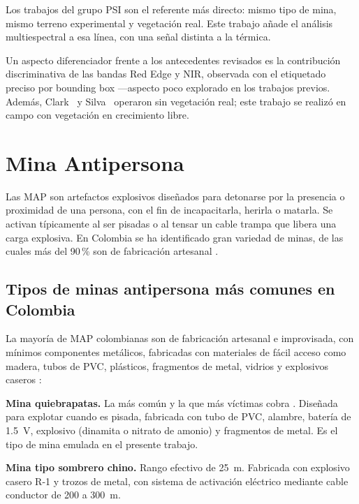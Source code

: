 \clearpage
Los trabajos del grupo \ac{PSI} \cite{forero2022,tenorio2024} son el
referente más directo: mismo tipo de mina, mismo terreno experimental y
vegetación real. Este trabajo añade el análisis multiespectral a esa línea,
con una señal distinta
a la térmica.

Un aspecto diferenciador frente a los antecedentes revisados es la contribución
discriminativa de las bandas Red Edge y \ac{NIR}, observada con el etiquetado
preciso por bounding box ---aspecto poco explorado en los trabajos previos. Además, Clark~\etal{} y Silva~\etal{} operaron sin vegetación
real; este trabajo se realizó en campo con vegetación en crecimiento libre.

\section{Mina Antipersona}

Las \ac{MAP} son artefactos explosivos diseñados para detonarse por la
presencia o proximidad de una persona, con el fin de incapacitarla,
herirla o matarla. Se activan típicamente al ser pisadas o al tensar un
cable trampa que libera una carga explosiva. En Colombia se ha identificado
gran variedad de minas, de las cuales más del 90\,\% son de fabricación
artesanal \cite{ocha2015,unicef2021}.

\subsection{Tipos de minas antipersona más comunes en Colombia}

La mayoría de \ac{MAP} colombianas son de fabricación artesanal e
improvisada, con mínimos componentes metálicos, fabricadas con materiales
de fácil acceso como madera, tubos de \ac{PVC}, plásticos, fragmentos de
metal, vidrios y explosivos caseros \cite{mineban2010,gutierrez2014}:

\textbf{Mina quiebrapatas.} La más común y la que más víctimas cobra \cite{hernandez2023}.
Diseñada para explotar cuando es pisada, fabricada con tubo de \ac{PVC},
alambre, batería de 1.5~V, explosivo (dinamita o nitrato de amonio) y
fragmentos de metal. Es el tipo de mina emulada en el presente trabajo.

\textbf{Mina tipo sombrero chino.} Rango efectivo de \SI{25}{m}.
Fabricada con explosivo casero R-1 y trozos de metal, con sistema de
activación eléctrico mediante cable conductor de 200 a 300~m.

